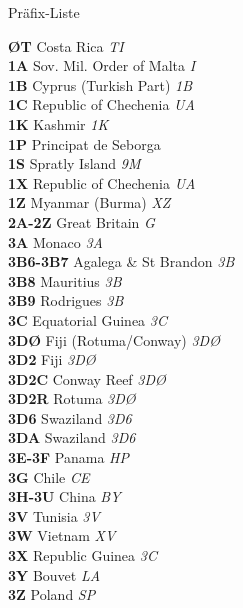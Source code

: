 \documentclass[landscape,a4paper]{article}
\begin{document}
\begin{multicols}{7}

\begin{center}
Präfix-Liste
\end{center}

\fontsize{7pt}{8pt}\selectfont

\noindent
\textbf{ØT} Costa Rica \emph{TI} \\
\textbf{1A} Sov. Mil. Order of Malta \emph{I} \\
\textbf{1B} Cyprus (Turkish Part) \emph{1B} \\
\textbf{1C} Republic of Chechenia \emph{UA} \\
\textbf{1K} Kashmir \emph{1K} \\
\textbf{1P} Principat de Seborga \\
\textbf{1S} Spratly Island \emph{9M} \\
\textbf{1X} Republic of Chechenia \emph{UA} \\
\textbf{1Z} Myanmar (Burma) \emph{XZ} \\
\textbf{2A-2Z} Great Britain \emph{G} \\
\textbf{3A} Monaco \emph{3A} \\
\textbf{3B6-3B7} Agalega \& St Brandon \emph{3B} \\
\textbf{3B8} Mauritius \emph{3B} \\
\textbf{3B9} Rodrigues \emph{3B} \\
\textbf{3C} Equatorial Guinea \emph{3C} \\
\textbf{3DØ} Fiji (Rotuma/Conway) \emph{3DØ} \\
\textbf{3D2} Fiji \emph{3DØ} \\
\textbf{3D2C} Conway Reef \emph{3DØ} \\
\textbf{3D2R} Rotuma \emph{3DØ} \\
\textbf{3D6} Swaziland \emph{3D6} \\
\textbf{3DA} Swaziland \emph{3D6} \\
\textbf{3E-3F} Panama \emph{HP} \\
\textbf{3G} Chile \emph{CE} \\
\textbf{3H-3U} China \emph{BY} \\
\textbf{3V} Tunisia \emph{3V} \\
\textbf{3W} Vietnam \emph{XV} \\
\textbf{3X} Republic Guinea \emph{3C} \\
\textbf{3Y} Bouvet \emph{LA} \\
\textbf{3Z} Poland \emph{SP} \\

\end{multicols}
\end{document}
